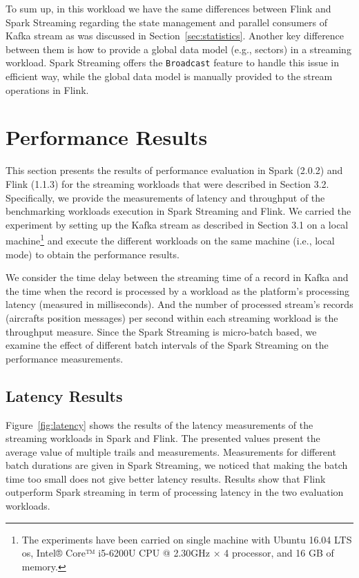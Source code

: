 \documentclass[]{article}
\begin{document}
\begin{itemize}
 \end{itemize}
 
 
 \par To sum up, in this workload we have the  same differences between Flink and Spark Streaming regarding the state management and parallel  consumers of Kafka stream as was discussed in Section~\ref{sec:statistics}. Another key difference between them is how  to provide a global data model (e.g., sectors) in a streaming workload. Spark Streaming offers the \texttt{Broadcast} feature to handle this issue in efficient way, while the global data model is manually provided  to the stream operations in Flink.
\section{Performance Results}
\label{sec:sec4}
\par This section presents the results of performance evaluation in Spark (2.0.2) and Flink (1.1.3) for the streaming workloads that were described in Section 3.2. Specifically, we provide  the measurements of latency and throughput of the benchmarking workloads execution in Spark Streaming and Flink. We carried the experiment by setting up the Kafka stream as described in Section 3.1 on a local machine\footnote{ The experiments have been carried  on single machine with Ubuntu 16.04 LTS os, Intel® Core™ i5-6200U CPU @ 2.30GHz × 4  processor, and 16 GB of memory.} and execute the different workloads on the same machine (i.e., local mode) to obtain the performance results.  

\par We consider the time delay between the streaming time of a record in Kafka and  the time when the record is processed by a workload as the platform's processing latency (measured in milliseconds). And the number of processed stream's records (aircrafts position messages) per second within each streaming workload is the throughput measure. Since the Spark Streaming is micro-batch based,  we examine the effect of different batch intervals
of the Spark Streaming on the performance measurements.


\subsection{Latency Results}

Figure~\ref{fig:latency} shows the results of the latency measurements of the streaming workloads in Spark and Flink. The presented values present the average value of multiple trails and measurements. Measurements for different batch durations are given in Spark Streaming, we noticed that making the batch time too small does not give better latency results. Results show that Flink outperform Spark streaming in term of processing latency in the two evaluation workloads.
\end{document}
